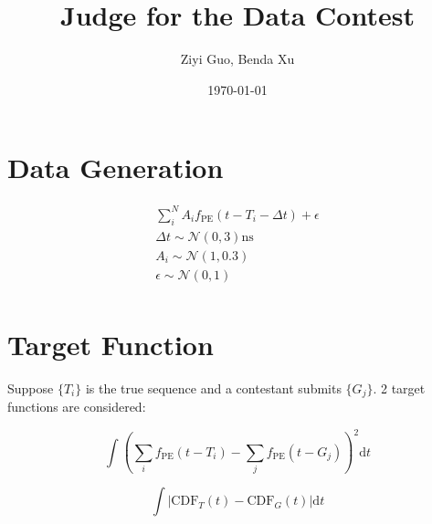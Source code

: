 \documentclass[11pt,a4paper]{article}
\author{Ziyi Guo, Benda Xu}
\date{\today}
\title{Judge for the Data Contest}
\begin{document}
\maketitle
\tableofcontents

\section{Data Generation}
\label{sec:orgd2c074a}
\begin{equation}
  \label{eq:1}
  \begin{aligned}
  \sum_i^N A_i f_\mathrm{PE}(t-T_i-\Delta{t}) + \epsilon \\
  \Delta{t} \sim \mathcal{N}(0, 3) \si{\ns} \\
  A_i \sim \mathcal{N}(1, 0.3) \\
  \epsilon \sim \mathcal{N}(0, 1) \\
  \end{aligned}
\end{equation}
\section{Target Function}
\label{sec:org114a5f6}
Suppose \(\{T_i\}\) is the true sequence and a contestant submits
\(\{G_j\}\).  2 target functions are considered:

\begin{equation}
  \label{eq:2}
  \int (\sum_i f_\mathrm{PE}(t-T_i) - \sum_j f_\mathrm{PE}(t-G_j))^2 \mathrm{d}t
\end{equation}

\begin{equation}
  \label{eq:3}
  \int |\mathrm{CDF}_T(t) - \mathrm{CDF}_G(t)| \mathrm{d}t
\end{equation}
\end{document}
